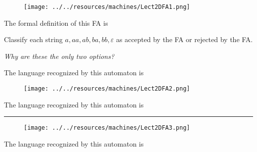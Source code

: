 \documentclass[12pt, oneside]{article}
\begin{document}
\begin{figure}[h]
   \centering
   \texttt{[image: ../../resources/machines/Lect2DFA1.png]} 
\end{figure}
   
The formal definition of this FA is
   
\vfill
\vfill
   

Classify each string $a, aa, ab, ba, bb, \varepsilon$ as accepted by the FA or rejected by the FA.  

{\it Why are these the only two options?}

\vspace{200pt}


The language recognized by this automaton is
  

\vfill

\newpage

\begin{figure}[h]
  \centering
  \texttt{[image: ../../resources/machines/Lect2DFA2.png]} 
\end{figure}
   

The language recognized by this automaton is
  


\vfill

\hrule

\begin{figure}[h]
    \centering
    \texttt{[image: ../../resources/machines/Lect2DFA3.png]} 
\end{figure}

The language recognized by this automaton is
  

\vfill \vfill
\end{document}
